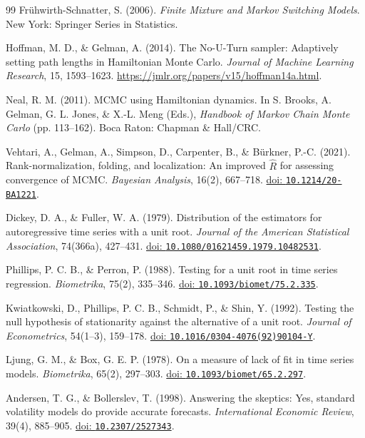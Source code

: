 \documentclass[12pt,a4paper]{article}
\numberwithin{equation}{section}
\begin{document}
\begin{thebibliography}{99}
Frühwirth-Schnatter, S. (2006).
\textit{Finite Mixture and Markov Switching Models}.
New York: Springer Series in Statistics.

Hoffman, M. D., \& Gelman, A. (2014).
The No-U-Turn sampler: Adaptively setting path lengths in Hamiltonian Monte Carlo.
\textit{Journal of Machine Learning Research}, 15, 1593--1623.
\url{https://jmlr.org/papers/v15/hoffman14a.html}.

Neal, R. M. (2011).
MCMC using Hamiltonian dynamics.
In S. Brooks, A. Gelman, G. L. Jones, \& X.-L. Meng (Eds.), \textit{Handbook of Markov Chain Monte Carlo} (pp. 113--162).
Boca Raton: Chapman \& Hall/CRC.

Vehtari, A., Gelman, A., Simpson, D., Carpenter, B., \& Bürkner, P.-C. (2021).
Rank-normalization, folding, and localization: An improved $\widehat R$ for assessing convergence of MCMC.
\textit{Bayesian Analysis}, 16(2), 667--718.
\href{https://doi.org/10.1214/20-BA1221}{doi: \nolinkurl{10.1214/20-BA1221}}.

Dickey, D. A., \& Fuller, W. A. (1979).
Distribution of the estimators for autoregressive time series with a unit root.
\textit{Journal of the American Statistical Association}, 74(366a), 427--431.
\href{https://doi.org/10.1080/01621459.1979.10482531}{doi: \nolinkurl{10.1080/01621459.1979.10482531}}.

Phillips, P. C. B., \& Perron, P. (1988).
Testing for a unit root in time series regression.
\textit{Biometrika}, 75(2), 335--346.
\href{https://doi.org/10.1093/biomet/75.2.335}{doi: \nolinkurl{10.1093/biomet/75.2.335}}.

Kwiatkowski, D., Phillips, P. C. B., Schmidt, P., \& Shin, Y. (1992).
Testing the null hypothesis of stationarity against the alternative of a unit root.
\textit{Journal of Econometrics}, 54(1--3), 159--178.
\href{https://doi.org/10.1016/0304-4076(92)90104-Y}{doi: \nolinkurl{10.1016/0304-4076(92)90104-Y}}.

Ljung, G. M., \& Box, G. E. P. (1978).
On a measure of lack of fit in time series models.
\textit{Biometrika}, 65(2), 297--303.
\href{https://doi.org/10.1093/biomet/65.2.297}{doi: \nolinkurl{10.1093/biomet/65.2.297}}.

Andersen, T. G., \& Bollerslev, T. (1998).
Answering the skeptics: Yes, standard volatility models do provide accurate forecasts.
\textit{International Economic Review}, 39(4), 885--905.
\href{https://doi.org/10.2307/2527343}{doi: \nolinkurl{10.2307/2527343}}.


\end{thebibliography}
\end{document}
